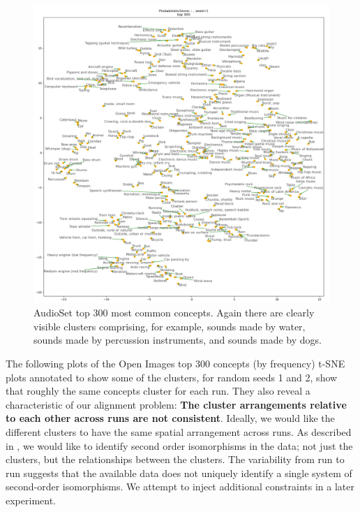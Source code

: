 \begin{figure}[H]
    \centering
    \label{fig:openimages1}
    \includegraphics[width=\textwidth]{images/method/probabilistic_independent/top300_tsne_audioset__ProbabilisticGlove_1.png}
    \caption{
        AudioSet top 300 most common concepts. Again there are clearly visible clusters comprising, for example, sounds made by water, sounds made by percussion instruments, and sounds made by dogs. 
    }
\end{figure}

The following plots of the Open Images top 300 concepts (by frequency) t-SNE plots annotated to show some of the clusters, for random seeds 1 and 2, show that roughly the same concepts cluster for each run. They also reveal a characteristic of our alignment problem: \textbf{The cluster arrangements relative to each other across runs are not consistent}. Ideally, we would like the different clusters to have the same spatial arrangement across runs. As described in \cite{SHEPARD19701}, we would like to identify second order isomorphisms in the data; not just the clusters, but the relationships between the clusters. The variability from run to run suggests that the available data does not uniquely identify a single system of second-order isomorphisms. We attempt to inject additional constraints in a later experiment.

